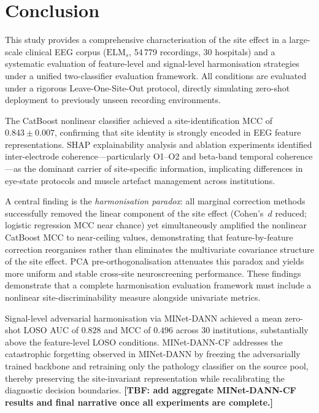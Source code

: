 \documentclass[preprint,12pt]{elsarticle}
\begin{document}
\section{Conclusion}
\label{sec:conclusion}

This study provides a comprehensive characterisation of the site
effect in a large-scale clinical EEG corpus ($\mathrm{ELM}_s$,
54\,779 recordings, 30 hospitals) and a systematic evaluation of
feature-level and signal-level harmonisation strategies under a
unified two-classifier evaluation framework.
All conditions are evaluated under a rigorous Leave-One-Site-Out
protocol, directly simulating zero-shot deployment to previously
unseen recording environments.

The CatBoost nonlinear classifier achieved a site-identification MCC
of $0.843 \pm 0.007$, confirming that site identity is strongly
encoded in EEG feature representations.
SHAP explainability analysis and ablation experiments identified
inter-electrode coherence---particularly O1--O2 and beta-band
temporal coherence---as the dominant carrier of site-specific
information, implicating differences in eye-state protocols and
muscle artefact management across institutions.

A central finding is the \emph{harmonisation paradox}: all marginal
correction methods successfully removed the linear component of the
site effect (Cohen's~$d$ reduced; logistic regression MCC near
chance) yet simultaneously amplified the nonlinear CatBoost MCC to
near-ceiling values, demonstrating that feature-by-feature correction
reorganises rather than eliminates the multivariate covariance
structure of the site effect.
PCA pre-orthogonalisation attenuates this paradox and yields more
uniform and stable cross-site neuroscreening performance.
These findings demonstrate that a complete harmonisation evaluation
framework must include a nonlinear site-discriminability measure
alongside univariate metrics.

Signal-level adversarial harmonisation via MINet-DANN achieved a mean
zero-shot LOSO AUC of $0.828$ and MCC of $0.496$ across 30
institutions, substantially above the feature-level LOSO conditions.
MINet-DANN-CF addresses the catastrophic forgetting observed in
MINet-DANN by freezing the adversarially trained backbone and
retraining only the pathology classifier on the source pool, thereby
preserving the site-invariant representation while recalibrating the
diagnostic decision boundaries.
\textbf{[TBF: add aggregate MINet-DANN-CF results and final
narrative once all experiments are complete.]}
\end{document}
